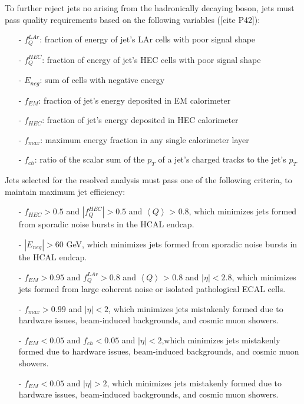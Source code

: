 To further reject jets no arising from the hadronically decaying boson, jets must pass quality requirements based on the following variables ([cite P42]):

\begin{itemize}
\item[-] $f_{Q}^{LAr}$: fraction of energy of jet's LAr cells with poor signal shape
\item[-] $f_{Q}^{HEC}$: fraction of energy of jet's HEC cells with poor signal shape
\item[-] $E_{neg}$: sum of cells with negative energy
\item[-] $f_{EM}$: fraction of jet's energy deposited in EM calorimeter
\item[-] $f_{HEC}$: fraction of jet's energy deposited in HEC calorimeter
\item[-] $f_{max}$: maximum energy fraction in any single calorimeter layer
\item[-] $f_{ch}$: ratio of the scalar sum of the $p_{T}$ of a jet's charged tracks to the jet's $p_{T}$
\end{itemize}

Jets selected for the resolved analysis must pass one of the following criteria, to maintain maximum jet efficiency:

\begin{itemize}
\item[-] $f_{HEC} > 0.5$ and $|f_{Q}^{HEC}| > 0.5$ and $\left\langle Q \right\rangle $ > 0.8, which minimizes jets formed from sporadic noise bursts in the HCAL endcap.
\item[-] $|E_{neg}| > 60$ GeV, which minimizes jets formed from sporadic noise bursts in the HCAL endcap.
\item[-] $f_{EM} > 0.95$ and $f_{Q}^{LAr} > 0.8$ and $\left\langle Q \right\rangle $ > 0.8 and $|\eta| < 2.8$, which minimizes jets formed from large coherent noise or isolated pathological ECAL cells.
\item[-] $f_{max} > 0.99$ and $|\eta| < 2$, which minimizes jets mistakenly formed due to hardware issues, beam-induced backgrounds, and cosmic muon showers.
\item[-] $f_{EM} < 0.05$ and $f_{ch} < 0.05$ and $|\eta| < 2$,which minimizes jets mistakenly formed due to hardware issues, beam-induced backgrounds, and cosmic muon showers.
\item[-] $f_{EM} < 0.05$ and  $|\eta| > 2$, which minimizes jets mistakenly formed due to hardware issues, beam-induced backgrounds, and cosmic muon showers.
\end{itemize}



